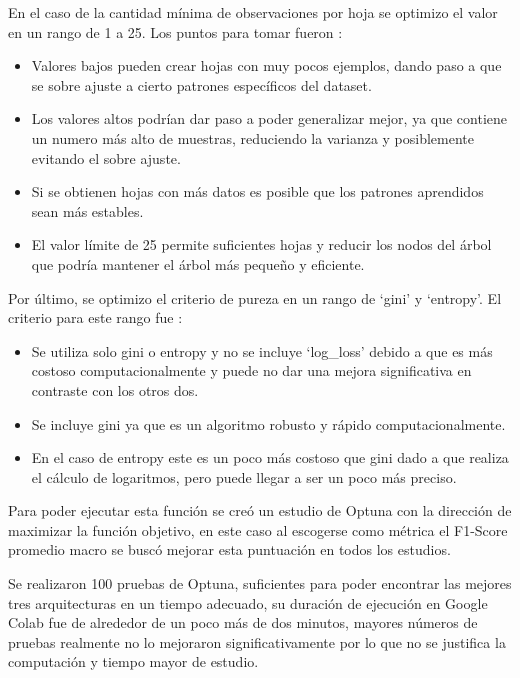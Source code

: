 \documentclass[12pt,a4paper]{article}
\begin{document}
En el caso de la cantidad mínima de observaciones por hoja se optimizo el valor en un rango de 1 a 25.
Los puntos para tomar fueron \autocite{ConfigureDecisionTreeClassifierMin_samples_leaf,wijayaNBDLite42023}:
\begin{itemize}
  \item Valores bajos pueden crear hojas con muy pocos ejemplos, dando paso a que se
    sobre ajuste a cierto patrones específicos del dataset.
  \item Los valores altos podrían dar paso a poder generalizar mejor, ya que contiene un numero
    más alto de muestras, reduciendo la varianza y posiblemente evitando el sobre ajuste.
  \item Si se obtienen hojas con más datos es posible que los patrones aprendidos sean más estables.
  \item El valor límite de 25 permite suficientes hojas y reducir los nodos del árbol que podría
    mantener el árbol más pequeño y eficiente.
\end{itemize}

Por último, se optimizo el criterio de pureza en un rango de `gini' y `entropy'.
El criterio para este rango fue \autocite{raschkaWhyAreWe0000,aznarDecisionTreesGini2020}:
\begin{itemize}
  \item Se utiliza solo gini o entropy y no se incluye `log_loss' debido a que es más costoso computacionalmente y puede no dar una
    mejora significativa en contraste con los otros dos.
  \item Se incluye gini ya que es un algoritmo robusto y rápido computacionalmente.
  \item En el caso de entropy este es un poco más costoso que gini dado a que realiza el cálculo de logaritmos, pero puede
    llegar a ser un poco más preciso.
\end{itemize}

Para poder ejecutar esta función se creó un estudio de Optuna con la dirección de maximizar la función objetivo,
en este caso al escogerse como métrica el F1-Score promedio macro se buscó mejorar esta puntuación en todos los estudios.

Se realizaron 100 pruebas de Optuna, suficientes para poder encontrar las mejores tres arquitecturas en un tiempo adecuado,
su duración de ejecución en Google Colab fue de alrededor de un poco más de dos minutos,
mayores números de pruebas realmente no lo mejoraron significativamente por lo que no se justifica la computación
y tiempo mayor de estudio.
\end{document}
